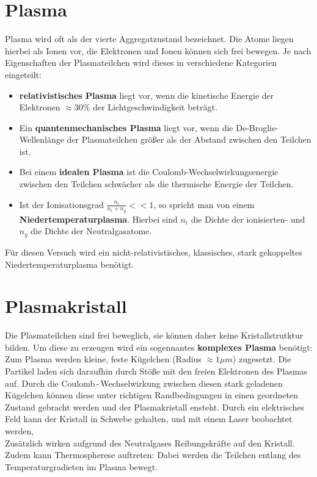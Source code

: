 \section{Plasma}
Plasma wird oft als der vierte Aggregatzustand bezeichnet. Die Atome liegen hierbei als Ionen vor, die Elektronen und Ionen können sich frei bewegen. Je nach Eigenschaften der Plasmateilchen wird dieses in verschiedene Kategorien eingeteilt:
\begin{itemize}
    \item \textbf{relativistisches Plasma} liegt vor, wenn die kinetische Energie der Elektronen $\approx30\%$ der Lichtgeschwindigkeit beträgt.
    \item Ein \textbf{quantenmechanisches Plasma} liegt vor, wenn die De-Broglie-Wellenlänge der Plasmateilchen größer als der Abstand zwischen den Teilchen ist.
    \item Bei einem \textbf{idealen Plasma} ist die Coulomb-Wechselwirkungsenergie zwischen den Teilchen schwächer als die thermische Energie der Teilchen.
    \item Ist der Ionisationsgrad $\frac{n_i}{n_i+n_g}<<1$, so spricht man von einem \textbf{Niedertemperaturplasma}. Hierbei sind $n_i$ die Dichte der ionisierten- und $n_g$ die Dichte der Neutralgasatome.
\end{itemize}
Für diesen Versuch wird ein nicht-relativistisches, klassisches, stark gekoppeltes 
Niedertemperaturplasma benötigt.

\section{Plasmakristall}
Die Plasmateilchen sind frei beweglich, sie können daher keine Kristallstrutktur bilden. Um diese zu erzeugen wird ein sogennantes \textbf{komplexes Plasma} benötigt: Zum Plasma werden kleine, feste Kügelchen (Radius $\approx1\mu m$) zugesetzt. Die Partikel laden sich daraufhin durch Stöße mit den freien Elektronen des Plasmas auf. Durch die Coulomb\,-\,Wechselwirkung zwischen diesen stark geladenen Kügelchen können diese unter richtigen Randbedingungen in einen geordneten Zustand gebracht werden und der Plasmakristall ensteht. Durch ein elektrisches Feld kann der Kristall in Schwebe gehalten, und mit einem Laser beobachtet werden,
\\
Zusätzlich wirken aufgrund des Neutralgases Reibungskräfte auf den Kristall. Zudem kann Thermospherese auftreten: Dabei werden die Teilchen entlang des Temperaturgradieten im Plasma bewegt.

